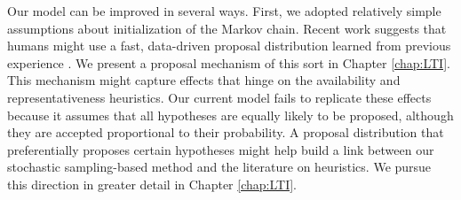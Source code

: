 
Our model can be improved in several ways. First, we adopted relatively simple assumptions about initialization of the Markov chain. Recent work suggests that humans might use a fast, data-driven proposal distribution learned from previous experience \citep{Yildirim15,Gershman2014b}. We present a proposal mechanism of this sort in Chapter \ref{chap:LTI}.
This mechanism might capture effects that hinge on the availability and representativeness heuristics. Our current model fails to replicate these effects because it assumes that all hypotheses are equally likely to be proposed, although they are accepted proportional to their probability. A proposal distribution that preferentially proposes certain hypotheses might help build a link between our stochastic sampling-based method and the literature on heuristics. We pursue this direction in greater detail in Chapter \ref{chap:LTI}.

